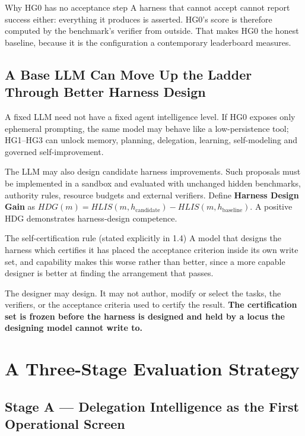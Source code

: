 \documentclass[11pt]{article}
\theoremstyle{definition}
\begin{document}
\begin{claimbox}{Why HG0 has no acceptance step}
A harness that cannot accept cannot report success either: everything it produces is asserted. HG0's score is therefore computed by the benchmark's verifier from outside. That makes HG0 the honest baseline, because it is the configuration a contemporary leaderboard measures.
\end{claimbox}

\subsection{A Base LLM Can Move Up the Ladder Through Better Harness Design}

A fixed LLM need not have a fixed agent intelligence level. If HG0 exposes only ephemeral prompting, the same model may behave like a low-persistence tool; HG1--HG3 can unlock memory, planning, delegation, learning, self-modeling and governed self-improvement.

The LLM may also design candidate harness improvements. Such proposals must be implemented in a sandbox and evaluated with unchanged hidden benchmarks, authority rules, resource budgets and external verifiers. Define \textbf{Harness Design Gain} as $HDG(m) = HLIS(m,h_{\text{candidate}}) - HLIS(m,h_{\text{baseline}})$. A positive HDG demonstrates harness-design competence.

\begin{cautionbox}{The self-certification rule (stated explicitly in 1.4)}
A model that designs the harness which certifies it has placed the acceptance criterion inside its own write set, and capability makes this worse rather than better, since a more capable designer is better at finding the arrangement that passes.

The designer may design. It may not author, modify or select the tasks, the verifiers, or the acceptance criteria used to certify the result. \textbf{The certification set is frozen before the harness is designed and held by a locus the designing model cannot write to.}
\end{cautionbox}

\section{A Three-Stage Evaluation Strategy}

\subsection{Stage A --- Delegation Intelligence as the First Operational Screen}
\end{document}
